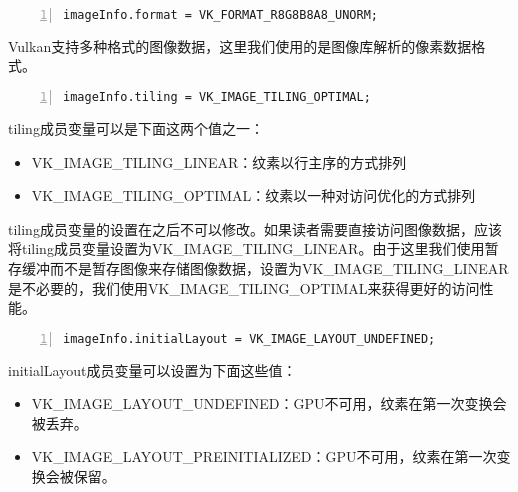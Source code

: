 \documentclass{ctexart}
\begin{document}
\begin{lstlisting}[language={[ANSI]C},keywordstyle=\color{blue!70},commentstyle=\color{red!50!green!50!blue!50},frame=shadowbox, rulesepcolor=\color{red!20!green!20!blue!20},basicstyle=\small,numbers=left, numberstyle=\tiny,breaklines=true]
imageInfo.format = VK_FORMAT_R8G8B8A8_UNORM;
\end{lstlisting}

Vulkan支持多种格式的图像数据，这里我们使用的是图像库解析的像素数据格式。

\begin{lstlisting}[language={[ANSI]C},keywordstyle=\color{blue!70},commentstyle=\color{red!50!green!50!blue!50},frame=shadowbox, rulesepcolor=\color{red!20!green!20!blue!20},basicstyle=\small,numbers=left, numberstyle=\tiny,breaklines=true]
imageInfo.tiling = VK_IMAGE_TILING_OPTIMAL;
\end{lstlisting}

tiling成员变量可以是下面这两个值之一：

\begin{itemize}
	\item VK\_IMAGE\_TILING\_LINEAR：纹素以行主序的方式排列
	\item VK\_IMAGE\_TILING\_OPTIMAL：纹素以一种对访问优化的方式排列
\end{itemize}

tiling成员变量的设置在之后不可以修改。如果读者需要直接访问图像数据，应该将tiling成员变量设置为VK\_IMAGE\_TILING\_LINEAR。由于这里我们使用暂存缓冲而不是暂存图像来存储图像数据，设置为VK\_IMAGE\_TILING\_LINEAR是不必要的，我们使用VK\_IMAGE\_TILING\_OPTIMAL来获得更好的访问性能。

\begin{lstlisting}[language={[ANSI]C},keywordstyle=\color{blue!70},commentstyle=\color{red!50!green!50!blue!50},frame=shadowbox, rulesepcolor=\color{red!20!green!20!blue!20},basicstyle=\small,numbers=left, numberstyle=\tiny,breaklines=true]
imageInfo.initialLayout = VK_IMAGE_LAYOUT_UNDEFINED;
\end{lstlisting}

initialLayout成员变量可以设置为下面这些值：

\begin{itemize}
	\item VK\_IMAGE\_LAYOUT\_UNDEFINED：GPU不可用，纹素在第一次变换会被丢弃。
	\item VK\_IMAGE\_LAYOUT\_PREINITIALIZED：GPU不可用，纹素在第一次变换会被保留。
\end{itemize}
\end{document}
